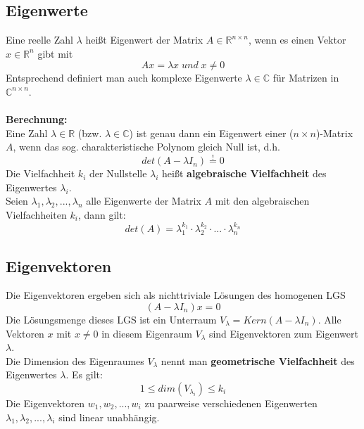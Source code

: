 \documentclass[a4paper,twocolumn,10pt]{article}
\newcommand{\sollsein}{\stackrel{!}{=}}
\begin{document}
\subsection{Eigenwerte}
Eine reelle Zahl $\lambda$ heißt Eigenwert der Matrix $A\in\mathbb{R}^{n\times n}$, wenn es einen Vektor $x\in\mathbb{R}^n$ gibt mit
\begin{equation*}
Ax=\lambda x\;und\;x\neq 0
\end{equation*}
Entsprechend definiert man auch komplexe Eigenwerte $\lambda\in\mathbb{C}$ für Matrizen in $\mathbb{C}^{n\times n}$.\\\\
\textbf{Berechnung:}\\
Eine Zahl $\lambda\in\mathbb{R}$ (bzw. $\lambda\in\mathbb{C}$) ist genau dann ein Eigenwert einer ($n\times n$)-Matrix $A$, wenn 
das sog. charakteristische Polynom gleich Null ist, d.h.
\begin{equation*}
det(A-\lambda I_n)\sollsein 0
\end{equation*}
Die Vielfachheit $k_i$ der Nullstelle $\lambda_i$ heißt \textbf{algebraische Vielfachheit} des Eigenwertes $\lambda_i$.\\
Seien $\lambda_1,\lambda_2,...,\lambda_n$ alle Eigenwerte der Matrix $A$ mit den algebraischen Vielfachheiten $k_i$, dann gilt:
\begin{equation*}
det(A)=\lambda_1^{k_1}\cdot \lambda_2^{k_2} \cdot ...\cdot \lambda_n^{k_n}
\end{equation*}

\subsection{Eigenvektoren}
Die Eigenvektoren ergeben sich als nichttriviale Lösungen des homogenen LGS
\begin{equation*}
(A-\lambda I_n)x=0
\end{equation*}
Die Lösungsmenge dieses LGS ist ein Unterraum $V_{\lambda}=Kern(A-\lambda I_n)$. Alle Vektoren $x$ mit $x\neq 0$ in diesem Eigenraum $V_{\lambda}$ sind Eigenvektoren zum Eigenwert $\lambda$.\\
Die Dimension des Eigenraumes $V_{\lambda}$ nennt man \textbf{geometrische Vielfachheit} des Eigenwertes $\lambda$. Es gilt:
\begin{equation*}
1\leq dim(V_{\lambda_i})\leq k_i
\end{equation*}
Die Eigenvektoren $w_1,w_2,...,w_i$ zu paarweise verschiedenen Eigenwerten $\lambda_1,\lambda_2,...,\lambda_i$ sind linear unabhängig.
\end{document}
